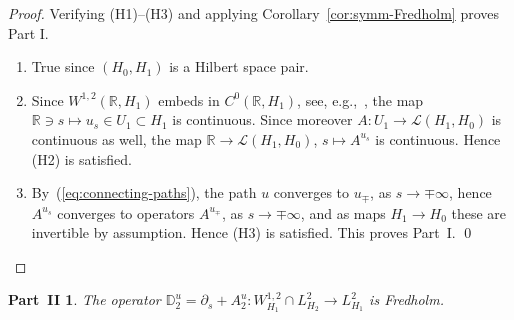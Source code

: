 \documentclass[pdftex]{sigma}
\numberwithin{equation}{section}
\newtheorem*{PartII}{Part~II}
\newcommand{\D}{{\mathbb{D}}}
\newcommand{\R}{{\mathbb{R}}}
\newcommand{\Ll}{{\mathcal{L}}} %
\newcommand{\p}{{\partial}}
\newcommand{\1}{{{\mathchoice {\rm 1\mskip-4mu l} {\rm 1\mskip-4mu l}
{\rm 1\mskip-4.5mu l} {\rm 1\mskip-5mu l}}}}
\begin{document}
\begin{proof}
Verifying (H1)--(H3) and applying Corollary~\ref{cor:symm-Fredholm} proves Part I.
\begin{enumerate}\itemsep=0pt
\item[(H1)] True since $(H_0,H_1)$ is a Hilbert space pair.
\item[(H2)] Since $W^{1,2}(\R,H_1)$ embeds in $C^0 (\R,H_1)$,
see, e.g.,~\cite[Appendix~A.6]{Frauenfelder:2025e},
the map $\R\ni s\mapsto u_s\in U_1\subset H_1$ is continuous.
Since moreover $A\colon U_1\to\Ll(H_1,H_0)$ is
continuous as well, the map
$\R\to \Ll(H_1,H_0)$, $s\mapsto A^{u_s}$
is continuous. Hence (H2) is satisfied.

\item[(H3)] By~(\ref{eq:connecting-paths}), the path $u$
converges to $u_\mp$, as $s\to\mp\infty$, hence
$A^{u_s}$ converges to operators $A^{u_\mp}$, as $s\to\mp\infty$,
and as maps $H_1\to H_0$ these are invertible by assumption.
Hence (H3) is satisfied. This proves Part~I.
\hfill\qed
\end{enumerate}
\renewcommand{\qed}{}
\end{proof}


\begin{PartII}The operator
$\D^u_2=\p_s+A^u_2\colon W^{1,2}_{H_1}\cap L^2_{H_2}\to L^2_{H_1}$
is Fredholm.
\end{PartII}
\end{document}
